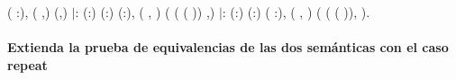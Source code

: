 \documentclass[12pt]{report}
\begin{document}
\begin{coqdoccode}
\coqdocindent{9.00em}
\coqdockw{\ensuremath{\forall}} ( :),  (   ,) (,)\coqdoceol
\coqdocindent{0.50em}
\ensuremath{|}: \coqdockw{\ensuremath{\forall}} (:) (:) (:), \coqdoceol
\coqdocindent{7.50em}
 (  , ) (  (  (  )) ,)\coqdoceol
\coqdocindent{0.50em}
\ensuremath{|}: \coqdockw{\ensuremath{\forall}} (:) (:) ( :),\coqdoceol
\coqdocindent{7.50em}
 (  , ) (  (   (  )), ).\coqdoceol
\coqdocemptyline
\end{coqdoccode}
\paragraph{Extienda la prueba de equivalencias de las dos semánticas con el caso repeat}
\end{document}
